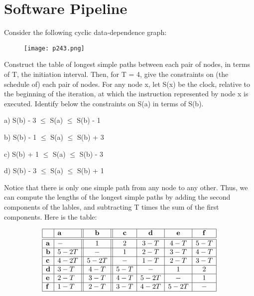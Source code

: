 \newpage
\section{Software Pipeline}





\begin{problem}

Consider the following cyclic data-dependence graph:
\begin{figure}[H]
    \centering
     \texttt{[image: p243.png]}
         \caption{}
         \label{fig:p243}
\end{figure}

Construct the table of longest simple paths between each pair of nodes, in terms of T, the initiation interval. Then, for T = 4, give the constraints on (the schedule of) each pair of nodes. For any node x, let S(x) be the clock, relative to the beginning of the iteration, at which the instruction represented by node x is executed. Identify below the constraints on S(a) in terms of S(b).

 
 	\item a) 	S(b) - 3 $\leq$ S(a) $\leq$ S(b) - 1
 	\item b) 	S(b) - 1 $\leq$ S(a) $\leq$ S(b) + 3
 	\item c) 	S(b) + 1 $\leq$ S(a) $\leq$ S(b) - 3
 	\item d) 	S(b) - 3 $\leq$ S(a) $\leq$ S(b) + 1


{\color{red}Notice that there is only one simple path from any node to any other. Thus, we can compute the lengths of the longest simple paths by adding the second components of the lables, and subtracting T times the sum of the first components. Here is the table:}

$$
\begin{array}{|l|l||c||c|c|c|c|}
\hline & \mathbf{a} & \mathbf{b} & \mathbf{c} & \mathbf{d} & \mathbf{e} & \mathbf{f} \\
\hline \hline \mathbf{a} & - & 1 & 2 & 3-T & 4-T & 5-T \\
\hline \mathbf{b} & 5-2 T & - & 1 & 2-T & 3-T & 4-T \\
\hline \mathbf{c} & 4-2 T & 5-2 T & - & 1-T & 2-T & 3-T \\
\hline \mathbf{d} & 3-T & 4-T & 5-T & - & 1 & 2 \\
\hline \mathbf{e} & 2-T & 3-T & 4-T & 5-2 T & - & 1 \\
\hline \mathbf{f} & 1-T & 2-T & 3-T & 4-2 T & 5-2 T & - \\
\hline
\end{array}
$$


\end{problem}
